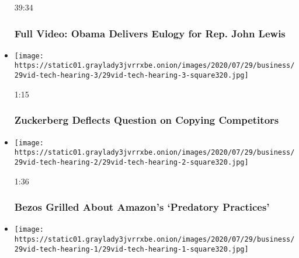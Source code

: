 \begin{itemize}
  39:34

  \hypertarget{full-video-obama-delivers-eulogy-for-rep-john-lewis}{%
  \subsubsection{Full Video: Obama Delivers Eulogy for Rep. John
  Lewis}\label{full-video-obama-delivers-eulogy-for-rep-john-lewis}}
\item
  \href{https://www.nytimes3xbfgragh.onion/video/us/politics/100000007263272/zuckerberg-jayapal-facebook.html?action=click\&module=video-series-bar\&region=header\&pgtype=Article\&playlistId=video/u-s}{}

  \texttt{[image: https://static01.graylady3jvrrxbe.onion/images/2020/07/29/business/29vid-tech-hearing-3/29vid-tech-hearing-3-square320.jpg]}

  1:15

  \hypertarget{zuckerberg-deflects-question-on-copying-competitors}{%
  \subsubsection{Zuckerberg Deflects Question on Copying
  Competitors}\label{zuckerberg-deflects-question-on-copying-competitors}}
\item
  \href{https://www.nytimes3xbfgragh.onion/video/us/100000007263183/bezos-amazon-predatory-practices.html?action=click\&module=video-series-bar\&region=header\&pgtype=Article\&playlistId=video/u-s}{}

  \texttt{[image: https://static01.graylady3jvrrxbe.onion/images/2020/07/29/business/29vid-tech-hearing-2/29vid-tech-hearing-2-square320.jpg]}

  1:36

  \hypertarget{bezos-grilled-about-amazons-predatory-practices}{%
  \subsubsection{Bezos Grilled About Amazon's `Predatory
  Practices'}\label{bezos-grilled-about-amazons-predatory-practices}}
\item
  \href{https://www.nytimes3xbfgragh.onion/video/us/politics/100000007263148/google-data-privacy.html?action=click\&module=video-series-bar\&region=header\&pgtype=Article\&playlistId=video/u-s}{}

  \texttt{[image: https://static01.graylady3jvrrxbe.onion/images/2020/07/29/business/29vid-tech-hearing-1/29vid-tech-hearing-1-square320.jpg]}


\end{itemize}
